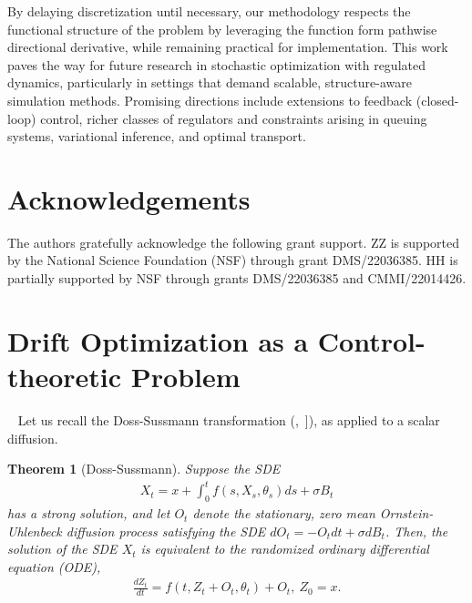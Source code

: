 \documentclass[11pt,leqno]{amsart}
\newtheorem{theorem}{Theorem}
\begin{document}
By delaying discretization until necessary, our methodology respects the functional structure of the problem by leveraging the function form pathwise directional derivative, while remaining practical for implementation. This work paves the way for future research in stochastic optimization with regulated dynamics, particularly in settings that demand scalable, structure-aware simulation methods. Promising directions include extensions to feedback (closed-loop) control, richer classes of regulators and constraints arising in queuing systems, variational inference, and optimal transport.

\section{Acknowledgements}
The authors gratefully acknowledge the following grant support. ZZ is supported by the National Science Foundation (NSF) through grant DMS/22036385. HH is partially supported by NSF through grants DMS/22036385 and CMMI/22014426.


% 


\newpage
\appendix
\section{Drift Optimization as a Control-theoretic Problem}~\label{sec:doss-sussmann}
 Let us recall the Doss-Sussmann transformation (\cite[Ch. V, Th. 25]{Protter},~\cite[Sec. 3.5.1]{Han_2017}]), as applied to a scalar diffusion.

    \begin{theorem}[Doss-Sussmann]
        Suppose the SDE
        \begin{align}\tag{$\star$}
        X_t = x + \int_0^t f(s,X_s,\theta_s) ds + \sigma B_t
        \end{align} 
        has a strong solution, and let $O_t$ denote the stationary, zero mean Ornstein-Uhlenbeck diffusion process satisfying the SDE $dO_t = - O_t dt + \sigma dB_t$. Then, the solution of the SDE $X_t$ is equivalent to the randomized ordinary differential equation (ODE),
        \begin{align*}
            \frac{d Z_t}{dt} = f(t,Z_t+O_t,\theta_t) + O_t,~Z_0 = x.
        \end{align*}
    \end{theorem}
\end{document}

